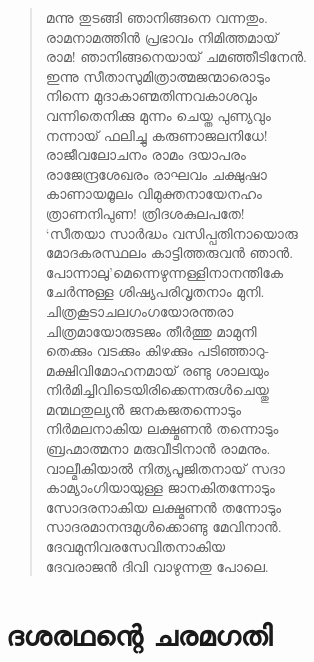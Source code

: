 \begin{verse}
മന്നു തുടങ്ങി ഞാനിങ്ങനെ വന്നതും.\\
രാമനാമത്തിന്‍ പ്രഭാവം നിമിത്തമായ്\\
രാമ! ഞാനിങ്ങനെയായ് ചമഞ്ഞീടിനേന്‍.\\
ഇന്നു സീതാസുമിത്രാത്മജന്മാരൊടും\\
നിന്നെ മുദാകാണ്മതിന്നവകാശവും\\
വന്നിതെനിക്കു മുന്നം ചെയ്ത പുണ്യവും\\
നന്നായ് ഫലിച്ചു കരുണാജലനിധേ!\\
രാജീവലോചനം രാമം ദയാപരം\\
രാജേന്ദ്രശേഖരം രാഘവം ചക്ഷുഷാ\\
കാണായമൂലം വിമുക്തനായേനഹം\\
ത്രാണനിപുണ! ത്രിദശകുലപതേ!\\
‘സീതയാ സാര്‍ദ്ധം വസിപ്പതിനായൊരു\\
മോദകരസ്ഥലം കാട്ടിത്തരുവന്‍ ഞാന്‍.\\
പോന്നാലു’മെന്നെഴുന്നള്ളിനാനന്തികേ\\
ചേര്‍ന്നുള്ള ശിഷ്യപരിവൃതനാം മുനി.\\
ചിത്രകൂടാചലഗംഗയോരന്തരാ\\
ചിത്രമായോരുടജം തീര്‍ത്തു മാമുനി\\
തെക്കും വടക്കും കിഴക്കും പടിഞ്ഞാറു-\\
മക്ഷിവിമോഹനമായ് രണ്ടു ശാലയും\\
നിര്‍മിച്ചിവിടെയിരിക്കെന്നരുള്‍ചെയ്തു\\
മന്മഥതുല്യന്‍ ജനകജതന്നൊടും\\
നിര്‍മലനാകിയ ലക്ഷ്മണന്‍ തന്നൊടും\\
ബ്രഹ്മാത്മനാ മരുവീടിനാന്‍ രാമനും.\\
വാല്മീകിയാല്‍ നിത്യപൂജിതനായ് സദാ\\
കാമ്യാംഗിയായുള്ള ജാനകിതന്നോടും\\
സോദരനാകിയ ലക്ഷ്മണന്‍ തന്നോടും\\
സാദരമാനന്ദമുള്‍ക്കൊണ്ടു മേവിനാന്‍.\\
ദേവമുനിവരസേവിതനാകിയ\\
ദേവരാജന്‍ ദിവി വാഴുന്നതു പോലെ.
\end{verse}
\bigskip


\section{ദശരഥന്റെ ചരമഗതി}

